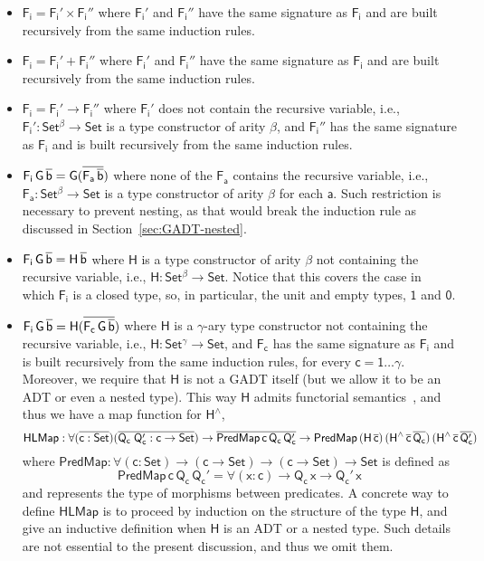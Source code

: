 \documentclass[acmsmall,screen,review,anonymous]{acmart}
\theoremstyle{definition}
\begin{document}
\begin{itemize}
\item $\mathsf{F_i = F_i' \times F_i''}$ where $\mathsf{F_i'}$ and $\mathsf{F_i''}$ have the same signature as $\mathsf{F_i}$ and are built recursively from the same induction rules.
\item $\mathsf{F_i = F_i' + F_i''}$ where $\mathsf{F_i'}$ and $\mathsf{F_i''}$ have the same signature as $\mathsf{F_i}$ and are built recursively from the same induction rules.
\item $\mathsf{F_i = F_i' \to F_i''}$
where $\mathsf{F_i'}$ does not contain the recursive variable,
i.e., $\mathsf{F_i' : Set^\beta \to Set}$ is a type constructor of arity $\mathsf{\beta}$,
and $\mathsf{F_i''}$ has the same signature as $\mathsf{F_i}$ and is built recursively from the same induction rules.
\item $\mathsf{F_i\,G\,\overline{b} = G(\overline{F_a\,\overline{b}})}$
where none of the $\mathsf{F_a}$ contains the recursive variable,
i.e., $\mathsf{F_a : Set^\beta \to Set}$
is a type constructor of arity $\mathsf{\beta}$
for each $\mathsf{a}$.
Such restriction is necessary to prevent nesting,
as that would break the induction rule as discussed in Section~\ref{sec:GADT-nested}.
\item $\mathsf{F_i\,G\,\overline{b} = H\,\overline{b}}$
where $\mathsf{H}$ is a type constructor of arity $\mathsf{\beta}$ not containing the recursive variable,
i.e., $\mathsf{H : Set^\beta \to Set}$.
Notice that this covers the case in which $\mathsf{F_i}$ is a closed type,
so, in particular, the unit and empty types, $\mathsf{1}$ and $\mathsf{0}$.
\item $\mathsf{F_i\,G\,\overline{b} = H (\overline{F_c\,G\,\overline{b}})}$
where $\mathsf{H}$ is a $\mathsf{\gamma}$-ary type constructor not containing the recursive variable,
i.e., $\mathsf{H : Set^\gamma \to Set}$,
and $\mathsf{F_c}$ has the same signature as $\mathsf{F_i}$  and is built recursively from the same induction rules, for every $\mathsf{c = 1 \dots \gamma}$.
Moreover, we require that $\mathsf{H}$ is not a GADT itself (but we allow it to be an ADT or even a nested type).
This way $\mathsf{H}$ admits functorial semantics~\cite{jp20}, and thus we have a map function for $\mathsf{H^{\wedge}}$,
\[
\mathsf{HLMap : \forall (\overline{c : Set}) (\overline{Q_c\;Q_c' : c \to Set})
	\to \overline{PredMap\,c\,Q_c\,Q_c'}
	\to PredMap\,(H\,\overline{c})\,(H^{\wedge}\,\overline{c}\,\overline{Q_c})\,(H^{\wedge}\,\overline{c}\,\overline{Q_c'})}
\]
where $\mathsf{PredMap : \forall (c : Set) \to (c \to Set) \to (c \to Set) \to Set}$
is defined as
\[
\mathsf{PredMap\,c\,Q_c\,Q_c' = \forall (x : c) \to Q_c\,x \to Q_c'\,x}
\]
and represents the type of morphisms between predicates.
A concrete way to define $\mathsf{HLMap}$ is to proceed by induction on the structure of the type $\mathsf{H}$,
and give an inductive definition when $\mathsf{H}$ is an ADT or a nested type.
Such details are not essential to the present discussion, and thus we omit them.
\end{itemize}
\end{document}
